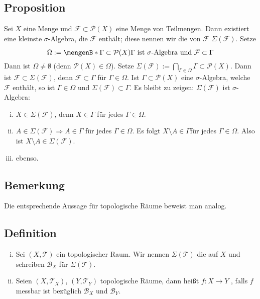 \subsection[Proposition: Kleinste $\sigma$-Algebra]{Proposition} %
\label{sub:94}
Sei $X$ eine Menge und $\mathcal{F} \subset \mathcal{P}(X)$ eine Menge von Teilmengen. Dann existiert eine kleinste $\sigma$-Algebra, die $\mathcal{F}$ enthält; diese nennen
wir die von $\mathcal{F}$  $\Sigma(\mathcal{F})$. 
Setze 
\[
	\Omega := \set[\Gamma \subset \mathcal{P}(X)]{ \Gamma \text{ ist } \sigma \text{-Algebra und } \mathcal{F} \subset\rule{0cm}{0.35cm} \Gamma} 
\]
Dann ist $\Omega \not= \emptyset$ (denn $\mathcal{P} (X) \in \Omega$). Setze $\Sigma (\mathcal{F}) := \bigcap_{\Gamma \in \Omega} \Gamma \subset \mathcal{P} (X)$. Dann ist
$\mathcal{F} \subset \Sigma (\mathcal{F})$, denn $\mathcal{F} \subset \Gamma$ für $\Gamma \in \Omega$. Ist $\Gamma \subset \mathcal{P}(X)$ eine $\sigma$-Algebra, welche
$\mathcal{F}$ enthält, so ist $\Gamma  \in \Omega$ und $\Sigma(\mathcal{F}) \subset \Gamma$. Es bleibt zu zeigen: $\Sigma (\mathcal{F})$ ist $\sigma$-Algebra:
\begin{enumerate}[(i)]
	\item $X \in \Sigma(\mathcal{F})$, denn $X \in \Gamma$ für jedes $\Gamma \in \Omega$.
	\item $A \in \Sigma(\mathcal{F}) \Rightarrow A \in \Gamma$ für jedes $\Gamma \in \Omega$. Es folgt $X \setminus A \in \Gamma $für jedes $\Gamma  \in \Omega$.
	Also ist $X \setminus A \in \Sigma(\mathcal{F})$.
	\item ebenso. \bewende
\end{enumerate}

\subsection[Bemerkung: \ref{sub:94} lässt sich analog auch auf Topologien übertragen]{Bemerkung} %
\label{sub:95}
Die entsprechende Aussage für topologische Räume beweist man analog. 

\subsection[Definition: $\sigma$-Algebra der Borelmengen, Borel-messbar]{Definition} %
\label{sub:96}
\begin{enumerate}[(i)]
	\item Sei $(X,\mathcal{T})$ ein topologischer Raum. Wir nennen $\Sigma(\mathcal{T} )$ die 
	 auf $X$ und schreiben $\mathcal{B}_X$ für $\Sigma(\mathcal{T} )$.
	\item Seien $(X,\mathcal{T}_X)$, $(Y,\mathcal{T}_Y)$ topologische Räume, dann heißt $f : X \to Y$ , falls $f$ messbar ist bezüglich 
	$\mathcal{B}_X$ und $\mathcal{B}_Y$.
\end{enumerate}

